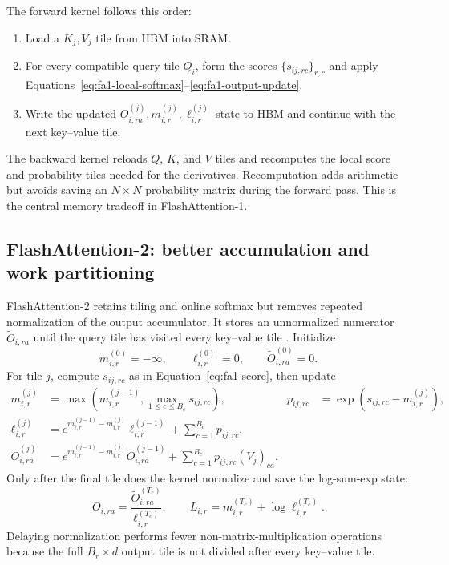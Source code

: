 \documentclass[11pt]{article}
\numberwithin{equation}{section}
\begin{document}
The forward kernel follows this order:
\begin{enumerate}
  \item Load a $K_j,V_j$ tile from HBM into SRAM.
  \item For every compatible query tile $Q_i$, form the scores
        $\{s_{ij,rc}\}_{r,c}$ and apply
        Equations~\eqref{eq:fa1-local-softmax}--\eqref{eq:fa1-output-update}.
  \item Write the updated $O_{i,ra}^{(j)},m_{i,r}^{(j)},\ell_{i,r}^{(j)}$ state to
        HBM and continue with the next key--value tile.
\end{enumerate}
The backward kernel reloads $Q$, $K$, and $V$ tiles and recomputes the local score
and probability tiles needed for the derivatives.  Recomputation adds arithmetic
but avoids saving an $N\times N$ probability matrix during the forward pass.  This
is the central memory tradeoff in FlashAttention-1.

\subsection{FlashAttention-2: better accumulation and work partitioning}
\label{sec:fa2}

FlashAttention-2 retains tiling and online softmax but removes repeated
normalization of the output accumulator.  It stores an unnormalized numerator
$\widetilde O_{i,ra}$ until the query tile has visited every key--value tile
\cite{dao2023flashattention2}.  Initialize
\begin{equation}
  m_{i,r}^{(0)}=-\infty,
  \qquad \ell_{i,r}^{(0)}=0,
  \qquad \widetilde O_{i,ra}^{(0)}=0.
\end{equation}
For tile $j$, compute $s_{ij,rc}$ as in Equation~\eqref{eq:fa1-score}, then update
\begin{align}
  m_{i,r}^{(j)}
  &=\max\!\left(m_{i,r}^{(j-1)},
                \max_{1\le c\le B_c}s_{ij,rc}\right),
  &p_{ij,rc}
  &=\exp\!\left(s_{ij,rc}-m_{i,r}^{(j)}\right),
  \label{eq:fa2-score-update}\\
  \ell_{i,r}^{(j)}
  &=e^{m_{i,r}^{(j-1)}-m_{i,r}^{(j)}}\ell_{i,r}^{(j-1)}
    +\sum_{c=1}^{B_c}p_{ij,rc},
  \label{eq:fa2-denominator-update}\\
  \widetilde O_{i,ra}^{(j)}
  &=e^{m_{i,r}^{(j-1)}-m_{i,r}^{(j)}}\widetilde O_{i,ra}^{(j-1)}
    +\sum_{c=1}^{B_c}p_{ij,rc}(V_j)_{ca}.
  \label{eq:fa2-numerator-update}
\end{align}
Only after the final tile does the kernel normalize and save the log-sum-exp state:
\begin{equation}
  O_{i,ra}
  =\frac{\widetilde O_{i,ra}^{(T_c)}}{\ell_{i,r}^{(T_c)}},
  \qquad
  L_{i,r}=m_{i,r}^{(T_c)}+\log\ell_{i,r}^{(T_c)}.
  \label{eq:fa2-finalize}
\end{equation}
Delaying normalization performs fewer non-matrix-multiplication operations because
the full $B_r\times d$ output tile is not divided after every key--value tile.
\end{document}
